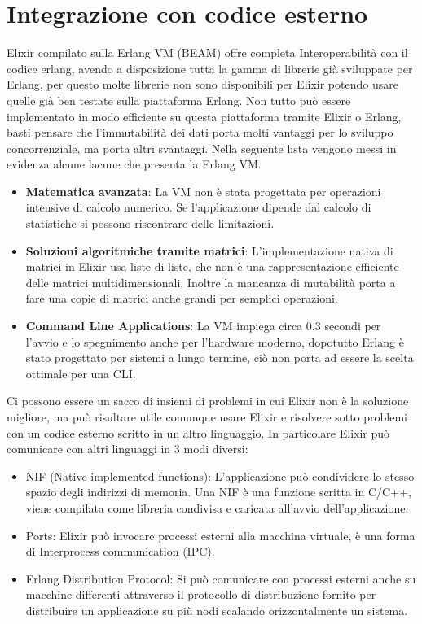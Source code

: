 \section{Integrazione con codice esterno}
Elixir compilato sulla Erlang VM (BEAM) offre completa Interoperabilità
con il codice erlang, avendo a disposizione tutta la gamma di librerie
già sviluppate per Erlang, per questo molte librerie non sono disponibili
per Elixir potendo usare quelle già ben testate sulla piattaforma Erlang.
Non tutto può essere implementato in modo efficiente su questa piattaforma
tramite Elixir o Erlang, basti pensare che l'immutabilità dei dati
porta molti vantaggi per lo sviluppo concorrenziale, ma porta altri
svantaggi. Nella seguente lista vengono messi in evidenza alcune
lacune che presenta la Erlang VM.

\begin{itemize}
	\item \textbf{Matematica avanzata}: La VM non è stata progettata per operazioni
	intensive di calcolo numerico. Se l'applicazione dipende dal calcolo di
	statistiche si possono riscontrare delle limitazioni.
	\item \textbf{Soluzioni algoritmiche tramite matrici}: L'implementazione
	nativa di matrici in Elixir usa liste di liste, che non è una rappresentazione
	efficiente delle matrici multidimensionali. Inoltre la mancanza di mutabilità
	porta a fare una copie di matrici anche grandi per semplici operazioni.
	\item \textbf{Command Line Applications}: La VM impiega circa 0.3 secondi
	per l'avvio e lo spegnimento anche per l'hardware moderno, dopotutto Erlang
	è stato progettato per sistemi a lungo termine, ciò non porta ad essere
	la scelta ottimale per una CLI.
\end{itemize}

Ci possono essere un sacco di insiemi di problemi in cui Elixir
non è la soluzione migliore, ma può risultare utile comunque
usare Elixir e risolvere sotto problemi con un codice esterno
scritto in un altro linguaggio.
In particolare Elixir può comunicare con altri linguaggi
in 3 modi diversi:

\begin{itemize}
	\item NIF (Native implemented functions): L'applicazione può condividere lo stesso
	spazio degli indirizzi di memoria.
	Una NIF è una funzione scritta in C/C++, viene compilata
	come libreria condivisa e caricata all'avvio dell'applicazione.
	\item Ports: Elixir può invocare processi esterni alla macchina
	virtuale, è una forma di Interprocess communication (IPC).
	\item Erlang Distribution Protocol: Si può comunicare con
	processi esterni anche su macchine differenti
	attraverso il protocollo di distribuzione fornito per distribuire
	un applicazione su più nodi scalando orizzontalmente un sistema.
\end{itemize}


